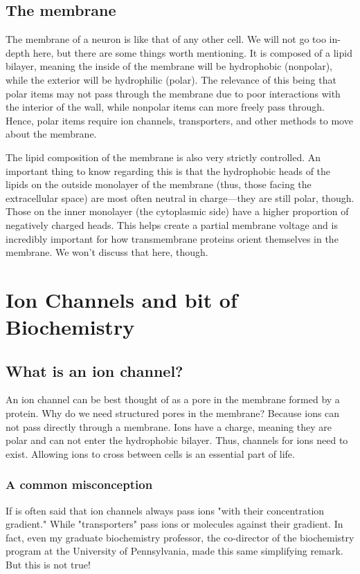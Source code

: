\documentclass[12pt]{amsart}
\begin{document}
\subsection{The membrane} The membrane of a neuron is like that of any other cell. We will not go too in-depth here, but there are some things worth mentioning. It is composed of a lipid bilayer, meaning the inside of the membrane will be hydrophobic (nonpolar), while the exterior will be hydrophilic (polar). The relevance of this being that polar items may not pass through the membrane due to poor interactions with the interior of the wall, while nonpolar items can more freely pass through. Hence, polar items require ion channels, transporters, and other methods to move about the membrane. \newline

The lipid composition of the membrane is also very strictly controlled. An important thing to know regarding this is that the hydrophobic heads of the lipids on the outside monolayer of the membrane (thus, those facing the extracellular space) are most often neutral in charge---they are still polar, though. Those on the inner monolayer (the cytoplasmic side) have a higher proportion of negatively charged heads. This helps create a partial membrane voltage and is incredibly important for how transmembrane proteins orient themselves in the membrane. We won't discuss that here, though. 

\section{Ion Channels and bit of Biochemistry}
\subsection{What is an ion channel?} An ion channel can be best thought of as a pore in the membrane formed by a protein. Why do we need structured pores in the membrane? Because ions can not pass directly through a membrane. Ions have a charge, meaning they are polar and can not enter the hydrophobic bilayer. Thus, channels for ions need to exist. Allowing ions to cross between cells is an essential part of life. 

\subsubsection{A common misconception} If is often said that ion channels always pass ions "with their concentration gradient." While "transporters" pass ions or molecules against their gradient. In fact, even my graduate biochemistry professor, the co-director of the biochemistry program at the University of Pennsylvania, made this same simplifying remark. But this is not true!\newline 
\end{document}
